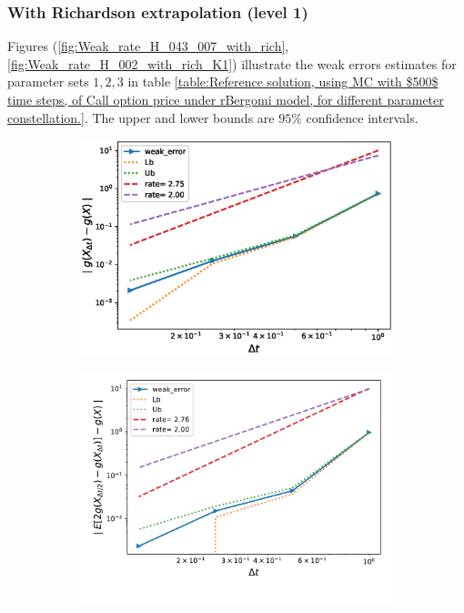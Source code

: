\subsubsection{With Richardson extrapolation (level 1)}
Figures (\ref{fig:Weak_rate_H_043_007_with_rich}, \ref{fig:Weak_rate_H_002_with_rich_K1}) illustrate the weak errors estimates for parameter sets $1,2,3$ in table \ref{table:Reference solution, using MC with $500$ time steps, of Call option price under rBergomi model, for different parameter constellation.}. The upper and lower bounds are $95\%$ confidence intervals.
\FloatBarrier
\begin{figure}[h!]
	\centering
	\begin{subfigure}{.35\textwidth}
		\centering
		\includegraphics[width=1\linewidth]{./figures/rBergomi_weak_error_rates/with_richardson/H_043/weak_convergence_order_Bergomi_H_043_K_1_M_10_6_richardson_relative}
		\caption{}
		\label{fig:sub3}
	\end{subfigure}%
	\begin{subfigure}{.35\textwidth}
		\centering
		\includegraphics[width=1\linewidth]{./figures/rBergomi_weak_error_rates/with_richardson/H_007/weak_convergence_order_Bergomi_H_007_K_1_richardson_relative_M_10_6}
		\caption{}
		\label{fig:sub4}
	\end{subfigure}
	

\end{figure}
